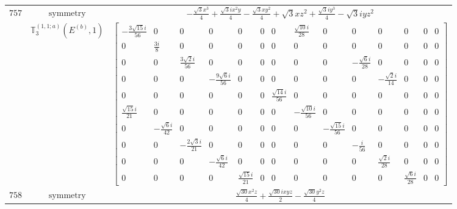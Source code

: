 \documentclass[fleqn,8pt,landscape]{jsarticle}
\begin{document}
\begin{longtable}{ccc}
$ 757 $ & $ \text{symmetry} $ & $ - \frac{\sqrt{3} x^{3}}{4} + \frac{\sqrt{3} i x^{2} y}{4} - \frac{\sqrt{3} x y^{2}}{4} + \sqrt{3} x z^{2} + \frac{\sqrt{3} i y^{3}}{4} - \sqrt{3} i y z^{2} $ \\
$  $ & $ \mathbb{T}_{3}^{(1,1;a)}(E^{(b)},1) $ & $ \begin{bmatrix} - \frac{3 \sqrt{15} i}{56} & 0 & 0 & 0 & 0 & 0 & 0 & \frac{\sqrt{10} i}{28} & 0 & 0 & 0 & 0 & 0 & 0 \\ 0 & \frac{3 i}{8} & 0 & 0 & 0 & 0 & 0 & 0 & 0 & 0 & 0 & 0 & 0 & 0 \\ 0 & 0 & \frac{3 \sqrt{2} i}{56} & 0 & 0 & 0 & 0 & 0 & 0 & - \frac{\sqrt{6} i}{28} & 0 & 0 & 0 & 0 \\ 0 & 0 & 0 & - \frac{9 \sqrt{6} i}{56} & 0 & 0 & 0 & 0 & 0 & 0 & - \frac{\sqrt{2} i}{14} & 0 & 0 & 0 \\ 0 & 0 & 0 & 0 & 0 & 0 & \frac{\sqrt{14} i}{56} & 0 & 0 & 0 & 0 & 0 & 0 & 0 \\ \frac{\sqrt{15} i}{21} & 0 & 0 & 0 & 0 & 0 & 0 & - \frac{\sqrt{10} i}{56} & 0 & 0 & 0 & 0 & 0 & 0 \\ 0 & - \frac{\sqrt{6} i}{42} & 0 & 0 & 0 & 0 & 0 & 0 & - \frac{\sqrt{15} i}{56} & 0 & 0 & 0 & 0 & 0 \\ 0 & 0 & - \frac{2 \sqrt{3} i}{21} & 0 & 0 & 0 & 0 & 0 & 0 & - \frac{i}{56} & 0 & 0 & 0 & 0 \\ 0 & 0 & 0 & - \frac{\sqrt{6} i}{42} & 0 & 0 & 0 & 0 & 0 & 0 & \frac{\sqrt{2} i}{28} & 0 & 0 & 0 \\ 0 & 0 & 0 & 0 & \frac{\sqrt{15} i}{21} & 0 & 0 & 0 & 0 & 0 & 0 & \frac{\sqrt{6} i}{28} & 0 & 0 \end{bmatrix} $ \\ \hline
$ 758 $ & $ \text{symmetry} $ & $ \frac{\sqrt{30} x^{2} z}{4} + \frac{\sqrt{30} i x y z}{2} - \frac{\sqrt{30} y^{2} z}{4} $ \\

\end{longtable}
\end{document}
